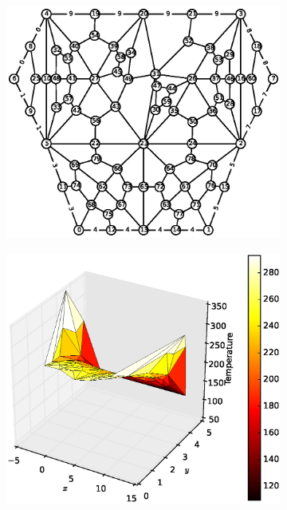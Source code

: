 \documentclass[10pt, a4paper]{article}
\begin{document}
\begin{figure}[H]
\centering
	\begin{subfigure}[H]{0.32\textwidth}
		\includegraphics[width=1.3\textwidth]{fig/test3_1.eps}
		\caption{}
		\label{fig:1}
	\end{subfigure}
	\begin{subfigure}[H]{0.33\textwidth}
		\includegraphics[width=\textwidth]{fig/test3_2.eps}
		\caption{}
		\label{fig:2}

\end{subfigure}
\end{figure}
\end{document}
